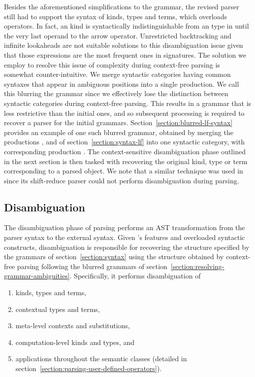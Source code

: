 Besides the aforementioned simplifications to the grammar, the revised parser still had to support the syntax of \LF kinds, types and terms, which overloads operators.
In fact, an \LF kind is syntactically indistinguishable from an \LF type in \Beluga until the very last operand to the arrow operator.
Unrestricted backtracking and infinite lookaheads are not suitable solutions to this disambiguation issue given that those expressions are the most frequent ones in \Beluga signatures.
The solution we employ to resolve this issue of complexity during context-free parsing is somewhat counter-intuitive.
We merge syntactic categories having common syntaxes that appear in ambiguous positions into a single production.
We call this blurring the grammar since we effectively lose the distinction between syntactic categories during context-free parsing.
This results in a grammar that is less restrictive than the initial ones, and so subsequent processing is required to recover a parser for the initial grammars.
Section~\ref{section:blurred-lf-syntax} provides an example of one such blurred grammar, obtained by merging the productions ,  and  of section~\ref{section:syntax-lf} into one syntactic category, with corresponding production .
The context-sensitive disambiguation phase outlined in the next section is then tasked with recovering the original \LF kind, type or term corresponding to a parsed \LF object.
We note that a similar technique was used in \Twelf since its shift-reduce parser could not perform disambiguation during parsing.

\subsection{Disambiguation}

The disambiguation phase of parsing performs an \ac{AST} transformation from the parser syntax to the external syntax.
Given \Beluga's features and overloaded syntactic constructs, disambiguation is responsible for recovering the structure specified by the grammars of section~\ref{section:syntax} using the structure obtained by context-free parsing following the blurred grammars of section~\ref{section:resolving-grammar-ambiguities}.
Specifically, it performs disambiguation of
\begin{enumerate}
\item \LF kinds, types and terms,
\item contextual \LF types and terms,
\item meta-level contexts and substitutions,
\item computation-level kinds and types, and
\item applications throughout the semantic classes (detailed in section~\ref{section:parsing-user-defined-operators}).
\end{enumerate}

